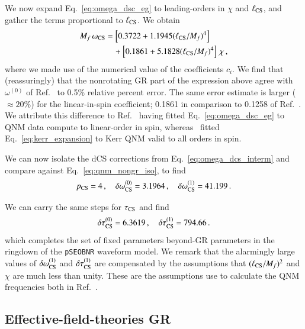 \documentclass[twocolumn,
               prd,
               aps,
               superscriptaddress,
               tightenlines,
               nofootinbib,
               eqsecnum,
               amsfonts,
               amsmath,
               longbibliography]{revtex4-1}
\newcommand{\Mf}{M_f}
\newcommand{\pSEOB}{\texttt{pSEOBNR}}
\begin{document}
We now expand Eq.~\eqref{eq:omega_dsc_eg} to leading-orders in $\chi$ and $\ell_{\rm CS}$, and
gather the terms proportional to $\ell_{\rm CS}$.
%
We obtain
%
\begin{align}
    \Mf \, \omega_{\rm CS} &=
    \left[ 0.3722 + 1.1945 (\ell_{\rm CS} / \Mf)^4 \right]
    \nonumber \\
    &\quad + \left[0.1861 + 5.1828 (\ell_{\rm CS} / \Mf)^4 \right] \, \chi\,,
    \label{eq:omega_dcs_interm}
\end{align}
%
where we made use of the numerical value of the coefficients $c_{i}$.
%
We find that (reassuringly) that the nonrotating GR part of the expression above agree with $\omega^{(0)}$ of Ref.~\cite{Maselli:2019mjd}
to 0.5\% relative percent error. The same error estimate is larger ($\approx 20$\%) for the linear-in-spin coefficient;
0.1861 in comparison to 0.1258 of Ref.~\cite{Maselli:2019mjd}.
%
We attribute this difference to Ref.~\cite{Wagle:2021tam} having fitted Eq.~\eqref{eq:omega_dsc_eg} to QNM data compute to linear-order in spin, whereas~\cite{Maselli:2019mjd}
fitted Eq.~\eqref{eq:kerr_expansion} to Kerr QNM valid to all orders in spin.

We can now isolate the dCS corrections from Eq.~\eqref{eq:omega_dcs_interm} and
compare against Eq.~\eqref{eq:qnm_nongr_iso}, to find
%
\begin{equation}
p_{\rm CS} = 4\,, \quad \delta \omega^{(0)}_{\rm CS} = 3.1964\,, \quad \delta \omega^{(1)}_{\rm CS} = 41.199\,.
\label{eq:cs_omega_coefs}
\end{equation}

We can carry the same steps for $\tau_{\rm CS}$ and find
%
\begin{equation}
\delta \tau^{(0)}_{\rm CS} = 6.3619\,, \quad \delta \tau^{(1)}_{\rm CS} = 794.66\,.
\label{eq:cs_tau_coefs}
\end{equation}
%
which completes the set of fixed parameters beyond-GR parameters in the ringdown of the \pSEOB{} waveform model.
%
We remark that the alarmingly large values of $\delta \omega_{\rm CS}^{(1)}$ and $\delta \tau_{\rm CS}^{(1)}$
are compensated by the assumptions that $(\ell_{\rm CS} / M_f)^2$ and $\chi$ are much less than unity. These
are the assumptions use to calculate the QNM frequencies both in Ref.~\cite{Wagle:2021tam}.

\subsection{Effective-field-theories GR}
\label{app:map_eftofgr}
\end{document}
